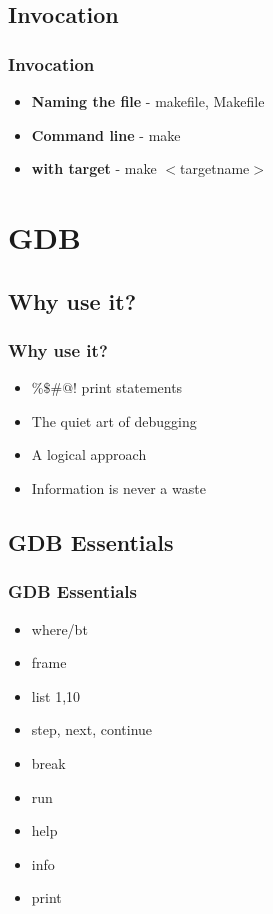 \documentclass{beamer}
\begin{document}
\subsection{Invocation}
\frame
{
    \frametitle{Invocation}

    \begin{itemize}
        \item \textbf{Naming the file} - makefile, Makefile
        \item \textbf{Command line} - make
        \item \textbf{with target} - make $<$targetname$>$
    \end{itemize}
}

\section{GDB}
\subsection{Why use it?}
\frame
{
    \frametitle{Why use it?}

    \begin{itemize}
        \item $\%\$\#$$@$! print statements
        \item The quiet art of debugging 
        \item A logical approach
        \item Information is never a waste
    \end{itemize}
}

\subsection{GDB Essentials}
\frame
{
    \frametitle{GDB Essentials}

    \begin{itemize}
        \item where/bt
        \item frame
        \item list 1,10
        \item step, next, continue
        \item break
        \item run
        \item help 
        \item info
        \item print
    \end{itemize}
}
\end{document}
